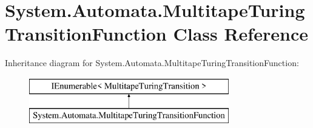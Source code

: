 \hypertarget{class_system_1_1_automata_1_1_multitape_turing_transition_function}{}\section{System.\+Automata.\+Multitape\+Turing\+Transition\+Function Class Reference}
\label{class_system_1_1_automata_1_1_multitape_turing_transition_function}
Inheritance diagram for System.\+Automata.\+Multitape\+Turing\+Transition\+Function\+:\begin{figure}[H]
\begin{center}
\leavevmode
\includegraphics[height=2.000000cm]{class_system_1_1_automata_1_1_multitape_turing_transition_function}
\end{center}
\end{figure}
